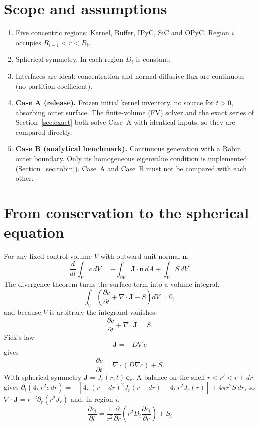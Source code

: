\documentclass[11pt]{article}
\begin{document}
\section{Scope and assumptions}
\begin{enumerate}
\item Five concentric regions: Kernel, Buffer, IPyC, SiC and OPyC. Region $i$ occupies $R_{i-1}<r<R_i$.
\item Spherical symmetry. In each region $D_i$ is constant.
\item Interfaces are ideal: concentration and normal diffusive flux are continuous (no partition coefficient).
\item \textbf{Case A (release).} Frozen initial kernel inventory, no source for $t>0$, absorbing outer surface. The finite-volume (FV) solver and the exact series of Section~\ref{sec:exact} both solve Case~A with identical inputs, so they are compared directly.
\item \textbf{Case B (analytical benchmark).} Continuous generation with a Robin outer boundary. Only its homogeneous eigenvalue condition is implemented (Section~\ref{sec:robin}). Case~A and Case~B must not be compared with each other.
\end{enumerate}

\section{From conservation to the spherical equation}
For any fixed control volume $V$ with outward unit normal $\mathbf n$,
\begin{equation}
\frac{d}{dt}\int_V c\,dV=-\int_{\partial V}\mathbf J\cdot\mathbf n\,dA+\int_V S\,dV.
\tag{TRISO-GOV-020}
\end{equation}
The divergence theorem turns the surface term into a volume integral,
\[
\int_V\left(\frac{\partial c}{\partial t}+\nabla\cdot\mathbf J-S\right)dV=0 ,
\]
and because $V$ is arbitrary the integrand vanishes:
\begin{equation}
\frac{\partial c}{\partial t}+\nabla\cdot\mathbf J=S.
\tag{TRISO-GOV-030}
\end{equation}
Fick's law
\begin{equation}
\mathbf J=-D\nabla c
\tag{TRISO-GOV-034}
\end{equation}
gives
\begin{equation}
\frac{\partial c}{\partial t}=\nabla\cdot(D\nabla c)+S.
\tag{TRISO-GOV-040}
\end{equation}
With spherical symmetry $\mathbf J=J_r(r,t)\,\mathbf e_r$. A balance on the shell $r<r'<r+dr$ gives
$\partial_t(4\pi r^2c\,dr)=-\left[4\pi(r+dr)^2J_r(r+dr)-4\pi r^2J_r(r)\right]+4\pi r^2S\,dr$, so $\nabla\cdot\mathbf J=r^{-2}\partial_r(r^2J_r)$ and, in region $i$,
\begin{equation}
\boxed{\frac{\partial c_i}{\partial t}=\frac{1}{r^2}\frac{\partial}{\partial r}\left(r^2D_i\frac{\partial c_i}{\partial r}\right)+S_i}
\tag{TRISO-FV-100}
\end{equation}
\end{document}
